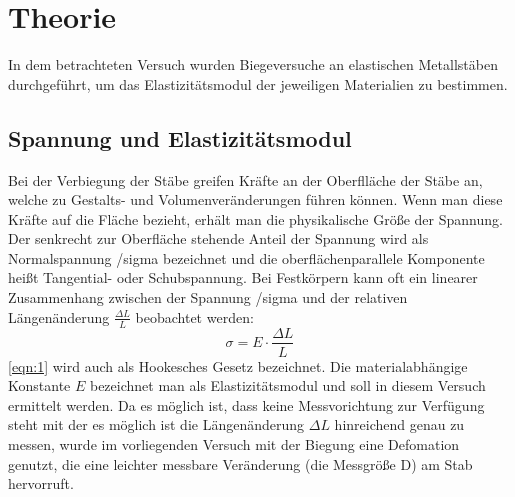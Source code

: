 \section{Theorie}
\label{sec:Theorie}
In dem betrachteten Versuch wurden Biegeversuche an elastischen Metallstäben durchgeführt, um das Elastizitätsmodul der jeweiligen Materialien zu bestimmen.
\subsection{Spannung und Elastizitätsmodul}
Bei der Verbiegung der Stäbe greifen Kräfte an der Oberflläche der Stäbe an, welche zu Gestalts- und Volumenveränderungen führen können. Wenn man diese Kräfte auf die Fläche bezieht, erhält man die physikalische Größe der Spannung. Der senkrecht zur Oberfläche stehende Anteil der Spannung wird als Normalspannung /sigma bezeichnet und die oberflächenparallele Komponente heißt Tangential- oder Schubspannung. \newline
Bei Festkörpern kann oft ein linearer Zusammenhang zwischen der Spannung /sigma und der relativen Längenänderung $\frac{\Delta L}{L}$ beobachtet werden:
\begin{equation}
	\sigma = E \cdot \frac{\Delta L}{L}
	\label{eqn:1}
\end{equation}
\autoref{eqn:1} wird auch als Hookesches Gesetz bezeichnet. Die materialabhängige Konstante $E$ bezeichnet man als Elastizitätsmodul und soll in diesem Versuch ermittelt werden. Da es möglich ist, dass keine Messvorichtung zur Verfügung steht mit der es möglich ist die Längenänderung $\Delta L$ hinreichend genau zu messen, wurde im vorliegenden Versuch mit der Biegung eine Defomation genutzt, die eine leichter messbare Veränderung (die Messgröße D) am Stab hervorruft.


